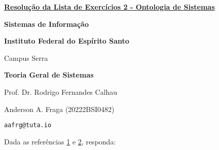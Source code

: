 \documentclass[article,a4paper]{abntex2}
\begin{document}
\underline{\textbf{Resolução da Lista de Exercícios 2 - Ontologia de Sistemas}}\par
\textbf{Sistemas de Informação}\par
\textbf{Instituto Federal do Espírito Santo}\par
Campus Serra\par
\textbf{Teoria Geral de Sistemas}\par
Prof. Dr. Rodrigo Fernandes Calhau\par
Anderson A. Fraga (20222BSI0482)\par
\texttt{aafrg@tuta.io}\vspace{1cm}  %

Dada as referências \href{https://nemo.inf.ufes.br/wp-content/papercite-data/pdf/exploring_system_behavior_in_a_system_ontology_2023.pdf}{1} e \href{https://nemo.inf.ufes.br/wp-content/papercite-data/pdf/a_system_core_ontology_for_capability_emergence_modeling_2023.pdf#page=3.33}{2}, responda:
\end{document}
